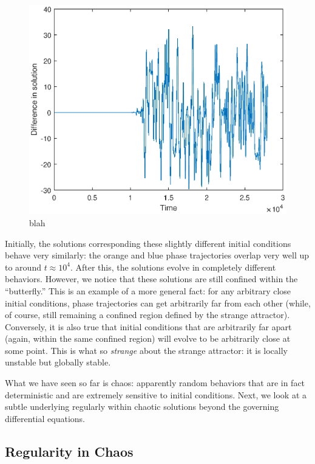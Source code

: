 \documentclass[twocolumn,amsmath,amssymb,aps]{revtex4}
\begin{document}
\begin{figure}[!htb]
	\centering
	\includegraphics[scale=0.5]{difference_init}
	\caption{blah}
	\label{fig:X_sensitive_1}
\end{figure}
Initially, the solutions corresponding these slightly different initial conditions behave very similarly: the orange and blue phase trajectories overlap very well up to around $t\approx 10^{4}$. After this, the solutions evolve in completely different behaviors. However, we notice that these solutions are still confined within the ``butterfly.'' This is an example of a more general fact: for any arbitrary close initial conditions, phase trajectories can get arbitrarily far from each other (while, of course, still remaining a confined region defined by the strange attractor). Conversely, it is also true that initial conditions that are arbitrarily far apart (again, within the same confined region) will evolve to be arbitrarily close at some point. This is what so \textit{strange} about the strange attractor: it is locally unstable but globally stable. 

What we have seen so far is chaos: apparently random behaviors that are in fact deterministic and are extremely sensitive to initial conditions. Next, we look at a subtle underlying regularly within chaotic solutions beyond the governing differential equations.






\subsection{Regularity in Chaos}
\end{document}
